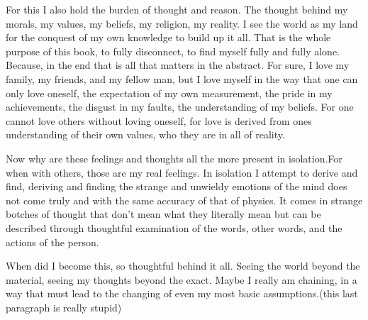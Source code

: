 \par For this I also hold the burden of thought and reason. The thought behind my morals, my values, my beliefs, my religion, my reality. I see the world as my land for the conquest of my own knowledge to build up it all. That is the whole purpose of this book, to fully disconnect, to find myself fully and fully alone. Because, in the end that is all that matters in the abstract. For sure, I love my family, my friends, and my fellow man, but I love myself in the way that one can only love oneself, the expectation of my own measurement, the pride in my achievements, the disgust in my faults, the understanding of my beliefs. For one cannot love others without loving oneself, for love is derived from ones understanding of their own values, who they are in all of reality.
\par Now why are these feelings and thoughts all the more present in isolation.For when with others, those are my real feelings. In isolation I attempt to derive and find, deriving and finding the strange and unwieldy emotions of the mind does not come truly and with the same accuracy of that of physics. It comes in strange botches of thought that don't mean what they literally mean but can be described through thoughtful examination of the words, other words, and the actions of the person.
\par When did I become this, so thoughtful behind it all. Seeing the world beyond the material, seeing my thoughts beyond the exact. Maybe I really am chaining, in a way that must lead to the changing of even my most basic assumptions.(this last paragraph is really stupid)






